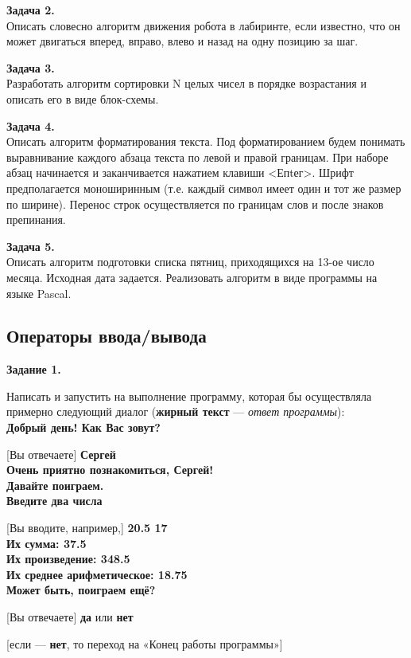 {\bf Задача 2.}\\ 
Описать словесно алгоритм движения робота в лабиринте, если известно, что он может двигаться вперед, вправо, влево и назад на одну позицию за шаг.

{\bf Задача 3.}\\ 
Разработать алгоритм сортировки N целых чисел в порядке воз­растания и описать его в виде блок-схемы.

{\bf Задача 4.}\\ 
Описать алгоритм форматирования текста. Под форматированием будем понимать выравнивание каждого абзаца текста по левой и правой границам. При наборе абзац начинается и заканчивается нажатием клавиши <Епtег>. Шрифт предполагается моноширинным (т.е. каждый символ имеет один и тот же размер по ширине). Перенос строк осуществляется по границам слов и после знаков препинания.

{\bf Задача 5.}\\ 
Описать алгоритм подготовки списка пятниц, приходящихся на 13-ое число месяца. Исходная дата задается. Реализовать алго­ритм в виде программы на языке Pascal.

\subsection{Операторы ввода/вывода}

{\bf Задание 1.}

Написать и запустить на выполнение программу, которая бы осуществляла примерно следующий диалог ({\bf жирный текст} --- {\it ответ программы}):\\
{\bf Добрый день!  Как Вас зовут?}

  [Вы отвечаете] {\bf Сергей}\\
 {\bf Очень приятно познакомиться, Сергей! \\Давайте поиграем.}\\
 {\bf Введите два числа}
 
 [Вы вводите, например,]   {\bf 20.5 17}\\
 {\bf Их сумма: 37.5}\\
 {\bf Их произведение: 348.5}\\
 {\bf Их среднее арифметическое: 18.75}\\
 {\bf Может быть, поиграем ещё?}
 
[Вы отвечаете]  {\bf да}  или {\bf нет}

[если ---  {\bf нет},  то  переход на «Конец работы программы»]

